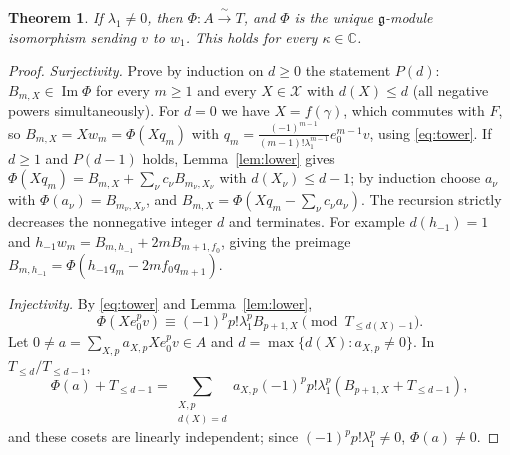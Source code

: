 \documentclass[11pt,a4paper]{article}
\newcommand{\C}{\mathbb C}
\newcommand{\g}{\mathfrak g}
\newcommand{\im}{\operatorname{Im}}
\newcommand{\X}{\mathcal X}
\newtheorem{theorem}{Theorem}[section]
\begin{document}
\begin{theorem}\label{thm:basic}
If $\lambda_1\ne0$, then $\Phi:A\xrightarrow{\ \sim\ }T$, and $\Phi$ is
the unique $\g$-module isomorphism sending $v$ to $w_1$. This holds for
every $\kappa\in\C$.
\end{theorem}
\begin{proof}
\emph{Surjectivity.} Prove by induction on $d\ge0$ the statement
$P(d)$: $B_{m,X}\in\im\Phi$ for every $m\ge1$ and every $X\in\X$ with
$d(X)\le d$ (all negative powers simultaneously). For $d=0$ we have
$X=f(\gamma)$, which commutes with $F$, so $B_{m,X}=Xw_m=\Phi(Xq_m)$ with
$q_m=\frac{(-1)^{m-1}}{(m-1)!\lambda_1^{m-1}}e_0^{m-1}v$, using
\eqref{eq:tower}. If $d\ge1$ and $P(d-1)$ holds, Lemma~\ref{lem:lower}
gives $\Phi(Xq_m)=B_{m,X}+\sum_\nu c_\nu B_{m_\nu,X_\nu}$ with
$d(X_\nu)\le d-1$; by induction choose $a_\nu$ with
$\Phi(a_\nu)=B_{m_\nu,X_\nu}$, and
$B_{m,X}=\Phi(Xq_m-\sum_\nu c_\nu a_\nu)$. The recursion strictly
decreases the nonnegative integer $d$ and terminates. For example
$d(h_{-1})=1$ and $h_{-1}w_m=B_{m,h_{-1}}+2mB_{m+1,f_0}$, giving the
preimage $B_{m,h_{-1}}=\Phi(h_{-1}q_m-2mf_0q_{m+1})$.

\emph{Injectivity.} By \eqref{eq:tower} and Lemma~\ref{lem:lower},
\begin{equation}\label{eq:leading}
 \Phi(Xe_0^pv)\equiv(-1)^pp!\lambda_1^pB_{p+1,X}
 \pmod{T_{\le d(X)-1}}.
\end{equation}
Let $0\ne a=\sum_{X,p}a_{X,p}Xe_0^pv\in A$ and
$d=\max\{d(X):a_{X,p}\ne0\}$. In $T_{\le d}/T_{\le d-1}$,
\[
 \Phi(a)+T_{\le d-1}
 =\sum_{\substack{X,p\\d(X)=d}}a_{X,p}(-1)^pp!\lambda_1^p
 (B_{p+1,X}+T_{\le d-1}),
\]
and these cosets are linearly independent; since $(-1)^pp!\lambda_1^p\ne0$,
$\Phi(a)\ne0$.
\end{proof}
\end{document}
